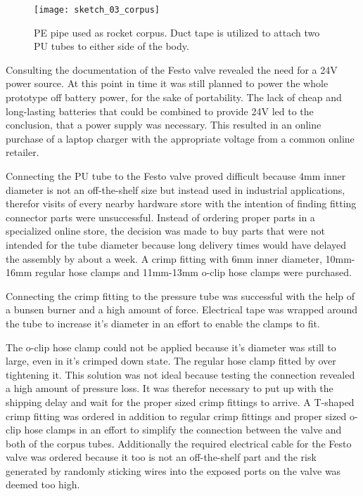 \begin{figure}[h]
\centering

\texttt{[image: sketch\_03\_corpus]}

\caption{PE pipe used as rocket corpus. Duct tape is utilized to attach two PU tubes to either side of the body.}
\end{figure}

Consulting the documentation of the Festo valve revealed the need for a 24V power source. At this point in time it was still planned to power the whole prototype off battery power, for the sake of portability. The lack of cheap and long-lasting batteries that could be combined to provide 24V led to the conclusion, that a power supply was necessary. This resulted in an online purchase of a laptop charger \cite{power-supply} with the appropriate voltage from a common online retailer.

Connecting the PU tube to the Festo valve proved difficult because 4mm inner diameter is not an off-the-shelf size but instead used in industrial applications, therefor visits of every nearby hardware store with the intention of finding fitting connector parts were unsuccessful. Instead of ordering proper parts in a specialized online store, the decision was made to buy parts that were not intended for the tube diameter because long delivery times would have delayed the assembly by about a week. A crimp fitting with 6mm inner diameter, 10mm-16mm regular hose clamps and 11mm-13mm o-clip hose clamps were purchased. 

Connecting the crimp fitting to the pressure tube was successful with the help of a bunsen burner and a high amount of force. Electrical tape was wrapped around the tube to increase it's diameter in an effort to enable the clamps to fit.

The o-clip hose clamp could not be applied because it's diameter was still to large, even in it's crimped down state. The regular hose clamp fitted by over tightening it. This solution was not ideal because testing the connection revealed a high amount of pressure loss. It was therefor necessary to put up with the shipping delay and wait for the proper sized crimp fittings to arrive. A T-shaped crimp fitting was ordered in addition to regular crimp fittings and proper sized o-clip hose clamps in an effort to simplify the connection between the valve and both of the corpus tubes. Additionally the required electrical cable for the Festo valve was ordered because it too is not an off-the-shelf part and the risk generated by randomly sticking wires into the exposed ports on the valve was deemed too high.


